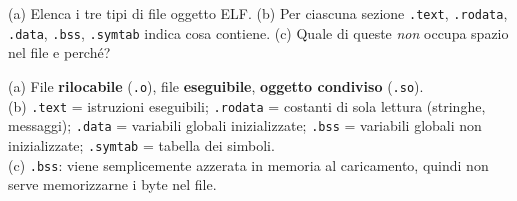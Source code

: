 \question[5]
(a) Elenca i tre tipi di file oggetto ELF.
(b) Per ciascuna sezione \lstinline|.text|, \lstinline|.rodata|, \lstinline|.data|, \lstinline|.bss|, \lstinline|.symtab| indica cosa contiene.
(c) Quale di queste \emph{non} occupa spazio nel file e perché?
\begin{solution}
(a) File \textbf{rilocabile} (\lstinline|.o|), file \textbf{eseguibile}, \textbf{oggetto condiviso} (\lstinline|.so|).\\
(b) \lstinline|.text| = istruzioni eseguibili; \lstinline|.rodata| = costanti di sola lettura (stringhe, messaggi); \lstinline|.data| = variabili globali inizializzate; \lstinline|.bss| = variabili globali non inizializzate; \lstinline|.symtab| = tabella dei simboli.\\
(c) \lstinline|.bss|: viene semplicemente azzerata in memoria al caricamento, quindi non serve memorizzarne i byte nel file.
\end{solution}
